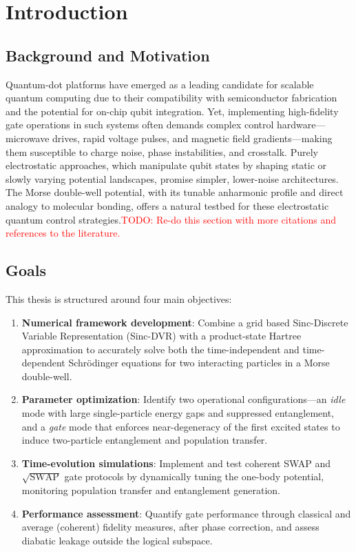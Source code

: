 \documentclass{subfiles}
\begin{document}
\chapter{Introduction}
\section{Background and Motivation}
Quantum-dot platforms have emerged as a leading candidate for scalable quantum computing due to their compatibility with semiconductor fabrication and the potential for on-chip qubit integration. Yet, implementing high-fidelity gate operations in such systems often demands complex control hardware—microwave drives, rapid voltage pulses, and magnetic field gradients—making them susceptible to charge noise, phase instabilities, and crosstalk. Purely electrostatic approaches, which manipulate qubit states by shaping static or slowly varying potential landscapes, promise simpler, lower-noise architectures. The Morse double-well potential, with its tunable anharmonic profile and direct analogy to molecular bonding, offers a natural testbed for these electrostatic quantum control strategies.\textcolor{red}{TODO: Re-do this section with more citations and references to the literature.}

\section{Goals}
This thesis is structured around four main objectives:
\begin{enumerate}
\item \textbf{Numerical framework development}: Combine a grid based Sinc-Discrete Variable Representation (Sinc-DVR) with a product-state Hartree approximation to accurately solve both the time-independent and time-dependent Schrödinger equations for two interacting particles in a Morse double-well.
\item \textbf{Parameter optimization}: Identify two operational configurations—an \textit{idle} mode with large single-particle energy gaps and suppressed entanglement, and a \textit{gate} mode that enforces near-degeneracy of the first excited states to induce two-particle entanglement and population transfer.
\item \textbf{Time-evolution simulations}: Implement and test coherent SWAP and $\sqrt{\text{SWAP}}$ gate protocols by dynamically tuning the one-body potential, monitoring population transfer and entanglement generation.
\item \textbf{Performance assessment}: Quantify gate performance through classical and average (coherent) fidelity measures, after phase correction, and assess diabatic leakage outside the logical subspace.
\end{enumerate}
\end{document}
